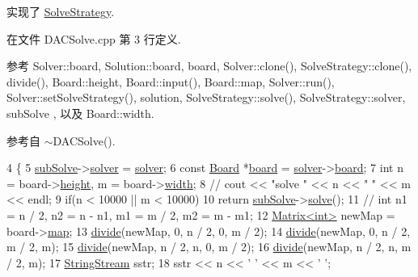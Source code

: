 实现了 \hyperlink{classSolveStrategy_ad3c3800be3e04570b466c3d8d054c500}{Solve\+Strategy}.



在文件 D\+A\+C\+Solve.\+cpp 第 3 行定义.



参考 Solver\+::board, Solution\+::board, board, Solver\+::clone(), Solve\+Strategy\+::clone(), divide(), Board\+::height, Board\+::input(), Board\+::map, Solver\+::run(), Solver\+::set\+Solve\+Strategy(), solution, Solve\+Strategy\+::solve(), Solve\+Strategy\+::solver, sub\+Solve , 以及 Board\+::width.



参考自 $\sim$\+D\+A\+C\+Solve().


\begin{DoxyCode}
4 \{
5     \hyperlink{classDACSolve_ae29a23fdf07424e738f99abf75de9dd4}{subSolve}->\hyperlink{classSolveStrategy_a94d43c47305176d0d3858697d3410443}{solver} = \hyperlink{classSolveStrategy_a94d43c47305176d0d3858697d3410443}{solver};
6     \textcolor{keyword}{const} \hyperlink{classBoard}{Board} *\hyperlink{classes_8txt_ab2104b75e0965a7c5fc13208045d9b59}{board} = \hyperlink{classSolveStrategy_a94d43c47305176d0d3858697d3410443}{solver}->\hyperlink{classSolver_a8966a22c2f247addc8ce453d119bc54e}{board};
7     \textcolor{keywordtype}{int} n = board->\hyperlink{classBoard_aa0cb8de0254520dc08dab5796643c8e5}{height}, m = board->\hyperlink{classBoard_a90a8efaa4736af25511ac948bdd27d6c}{width};
8     \textcolor{comment}{// cout << "solve " << n << " " << m << endl;}
9     \textcolor{keywordflow}{if}(n < 10000 || m < 10000)
10         \textcolor{keywordflow}{return} \hyperlink{classDACSolve_ae29a23fdf07424e738f99abf75de9dd4}{subSolve}->\hyperlink{classSolveStrategy_ad3c3800be3e04570b466c3d8d054c500}{solve}();
11     \textcolor{comment}{// int n1 = n / 2, n2 = n - n1, m1 = m / 2, m2 = m - m1;}
12     \hyperlink{classMatrix}{Matrix<int>} newMap = board->\hyperlink{classBoard_a191ff45df9151b8fee0c32877f582165}{map};
13     \hyperlink{classDACSolve_ac9ccf5c5fe3102bac8b34d7d90492841}{divide}(newMap, 0, n / 2, 0, m / 2);
14     \hyperlink{classDACSolve_ac9ccf5c5fe3102bac8b34d7d90492841}{divide}(newMap, 0, n / 2, m / 2, m);
15     \hyperlink{classDACSolve_ac9ccf5c5fe3102bac8b34d7d90492841}{divide}(newMap, n / 2, n, 0, m / 2);
16     \hyperlink{classDACSolve_ac9ccf5c5fe3102bac8b34d7d90492841}{divide}(newMap, n / 2, n, m / 2, m);
17     \hyperlink{global_8h_a3b00b4d9ec9db1584a445acde990ced6}{StringStream} sstr;
18     sstr << n << \textcolor{charliteral}{' '} << m << \textcolor{charliteral}{' '};

\end{DoxyCode}

